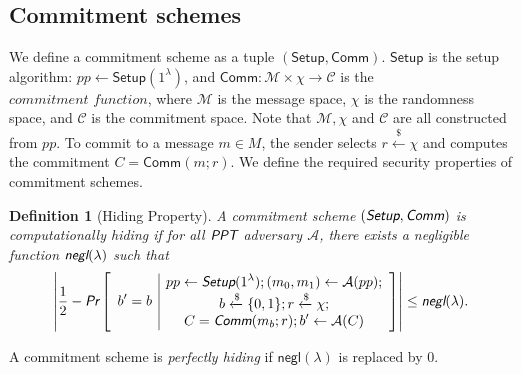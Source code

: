 \documentclass{article}
\theoremstyle{plain}
\newtheorem{definition}{Definition}[section]
\theoremstyle{remark}
\begin{document}
\subsection{Commitment schemes}\label{comm}
We define a commitment scheme as a tuple $(\textsf{Setup}, \textsf{Comm})$. $\textsf{Setup}$ is the setup algorithm: $pp\leftarrow\textsf{Setup}(1^{\lambda})$, and $\textsf{Comm}:\mathcal{M}\times{\chi}\rightarrow\mathcal{C}$ is the $\textit{commitment function}$, where $\mathcal{M}$ is the message space, $\chi$ is the randomness space, and $\mathcal{C}$ is the commitment space. Note that $\mathcal{M}, \chi$ and $\mathcal{C}$ are all constructed from $pp$.
To commit to a message $m \in M$, the sender selects $r\xleftarrow{\$}\chi$ and computes the commitment $C = \textsf{Comm}(m; r)$. We define the required security properties of commitment schemes.

\begin{definition}[Hiding Property]
A commitment scheme $(\emph{\textsf{Setup}}, \emph{\textsf{Comm}})$ is computationally hiding if for all $\emph{\textsf{PPT}}$ adversary $\mathcal{A}$, there exists a negligible function $\emph{\textsf{negl}}(\lambda)$ such that
\begin{align*}
\left| \frac{1}{2} - \emph{\textsf{Pr}}\left[
\begin{array}{c|c}
    \begin{gathered}
        b' = b
    \end{gathered}
    &
    \begin{gathered}
        pp\leftarrow\emph{\textsf{Setup}}(1^{\lambda}); (m_0, m_1)\leftarrow\mathcal{A}(pp); \\
        b\xleftarrow{\$}\{0,1\}; r \xleftarrow{\$}\chi; \\
        C = \emph{\textsf{Comm}}(m_b; r); b'\leftarrow\mathcal{A}(C)
    \end{gathered}
\end{array}
\right]\right|
\le \emph{\textsf{negl}}(\lambda).
\end{align*}
\end{definition}
A commitment scheme is \textit{perfectly hiding} if $\textsf{negl}(\lambda)$ is replaced by $0$.
\end{document}
